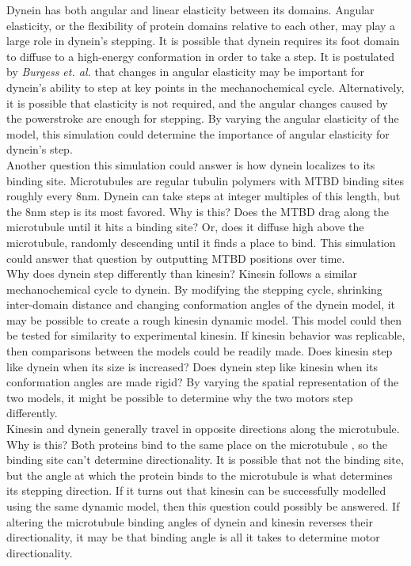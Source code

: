 \documentclass[
11pt, %
english, %
singlespacing, %
headsepline, %
chapterinoneline, %
]{MastersDoctoralThesis} %
\begin{document}
Dynein has both angular and linear elasticity between its domains. Angular elasticity, or the flexibility of protein domains relative to each other, may play a large role in dynein's stepping. It is possible that dynein requires its foot domain to diffuse to a high-energy conformation in order to take a step. It is postulated by \textit{Burgess et. al.} \cite{burgess-paper} that changes in angular elasticity may be important for dynein's ability to step at key points in the mechanochemical cycle. Alternatively, it is possible that elasticity is not required, and the angular changes caused by the powerstroke are enough for stepping. By varying the angular elasticity of the model, this simulation could determine the importance of angular elasticity for dynein's step.\\

Another question this simulation could answer is how dynein localizes to its binding site. Microtubules are regular tubulin polymers with MTBD binding sites roughly every 8nm. Dynein can take steps at integer multiples of this length, but the 8nm step is its most favored. Why is this? Does the MTBD drag along the microtubule until it hits a binding site? Or, does it diffuse high above the microtubule, randomly descending until it finds a place to bind. This simulation could answer that question by outputting MTBD positions over time.\\

Why does dynein step differently than kinesin? Kinesin follows a similar mechanochemical cycle to dynein. By modifying the stepping cycle, shrinking inter-domain distance and changing conformation angles of the dynein model, it may be possible to create a rough kinesin dynamic model. This model could then be tested for similarity to experimental kinesin. If kinesin behavior was replicable, then comparisons between the models could be readily made. Does kinesin step like dynein when its size is increased? Does dynein step like kinesin when its conformation angles are made rigid? By varying the spatial representation of the two models, it might be possible to determine why the two motors step differently.\\

Kinesin and dynein generally travel in opposite directions along the microtubule. Why is this? Both proteins bind to the same place on the microtubule \cite{kinesin-dynein-mt-overlap}, so the binding site can't determine directionality. It is possible that not the binding site, but the angle at which the protein binds to the microtubule is what determines its stepping direction. If it turns out that kinesin can be successfully modelled using the same dynamic model, then this question could possibly be answered. If altering the microtubule binding angles of dynein and kinesin reverses their directionality, it may be that binding angle is all it takes to determine motor directionality.\\
\end{document}
